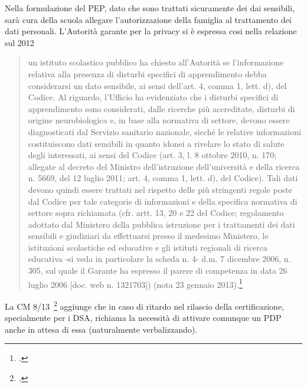 Nella formulazione del PEP, dato che sono trattati sicuramente dei dai sensibili, sarà cura della scuola allegare l'autorizzazione della famiglia al trattamento dei dati personali.
L'Autorità garante per la privacy si è espressa cosi nella relazione sul 2012
\begin{quote}
	un istituto scolastico pubblico ha chiesto all'Autorità se l'informazione
	relativa alla presenza di disturbi specifici di apprendimento debba considerarsi un dato
	sensibile, ai sensi dell'art. 4, comma 1, lett. d), del Codice.
	Al riguardo, l'Ufficio ha evidenziato che i disturbi specifici di apprendimento sono
	considerati, dalle ricerche più accreditate, disturbi di origine neurobiologica e, in base alla
	normativa di settore, devono essere diagnosticati dal Servizio sanitario nazionale, sicché le
	relative informazioni costituiscono dati sensibili in quanto idonei a rivelare lo stato di salute
	degli interessati, ai sensi del Codice (art. 3, l. 8 ottobre 2010, n. 170; 
	allegate al decreto del Ministro dell'istruzione dell'università e della ricerca n. 5669, del 12
	luglio 2011; art. 4, comma 1, lett. d), del Codice).
	Tali dati devono quindi essere trattati nel rispetto delle più stringenti regole poste dal
	Codice per tale categorie di informazioni e della specifica normativa di settore sopra
	richiamata (cfr. artt. 13, 20 e 22 del Codice; regolamento adottato dal Ministero della
	pubblica istruzione per i trattamenti dei dati sensibili e giudiziari da effettuarsi presso il
	medesimo Ministero, le istituzioni scolastiche ed educative e gli istituti regionali di ricerca
	educativa -si veda in particolare la scheda n. 4- d.m. 7 dicembre 2006, n. 305, sul quale il
	Garante ha espresso il parere di competenza in data 26 luglio 2006 [doc. web n. 1321703])
	(nota 23 gennaio 2013).\footcite{garantep2013}
\end{quote}

La CM 8/13~\footcite{cm8_2013} aggiunge che in caso di ritardo nel rilascio della certificazione, specialmente per i DSA, richiama la necessità di attivare comunque un PDP anche in attesa di essa (naturalmente verbalizzando). 


